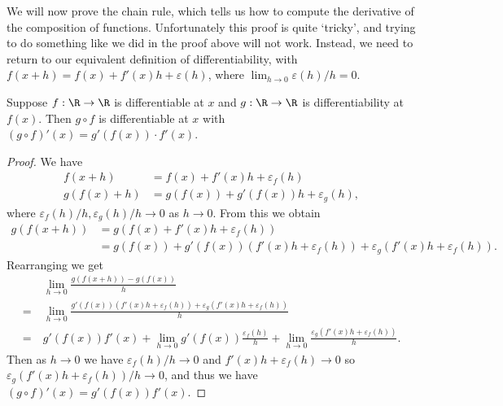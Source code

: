 We will now prove the chain rule, which tells us how to compute the derivative of the composition of functions. Unfortunately this proof is quite `tricky', and trying to do something like we did in the proof above will not work. Instead, we need to return to our equivalent definition of differentiability, with $f(x + h) = f(x) + f'(x) h + \varepsilon(h)$, where $\displaystyle\lim_{h \to 0}\varepsilon(h)/h = 0$.

\begin{proposition}
	Suppose $f: \R \rightarrow \R$ is differentiable at $x$ and $g: \R \rightarrow \R$ is differentiability at $f(x)$. Then $g \circ f$ is differentiable at $x$ with $(g \circ f)'(x) = g'(f(x)) \cdot f'(x)$.
\end{proposition}
\begin{proof}
	We have
	\begin{align*}
	f(x + h) &= f(x) + f'(x)h + \varepsilon_f(h) \\
		g(f(x) + h) &= g(f(x)) + g'(f(x)) h + \varepsilon_g(h),
	\end{align*}
	where $\varepsilon_f(h)/h, \varepsilon_g(h)/h \rightarrow 0$ as $h \rightarrow 0$. From this we obtain
	\begin{align*}
		g(f(x + h)) &= g(f(x) + f'(x)h + \varepsilon_f(h)) \\
		&= g(f(x)) + g'(f(x))(f'(x)h + \varepsilon_f(h)) + \varepsilon_g(f'(x)h + \varepsilon_f(h)).
	\end{align*}
	Rearranging we get
	\begin{align*}
		&\lim_{h \to 0}\frac{g(f(x + h)) - g(f(x))}{h}\\
		=\ &\lim_{h \to 0} \frac{g'(f(x))(f'(x)h + \varepsilon_f(h)) + \varepsilon_g(f'(x)h + \varepsilon_f(h))}{h} \\
		=\ &g'(f(x))f'(x) +  \lim_{h \to 0}g'(f(x)) \frac{\varepsilon_f(h)}{h} +\lim_{h \to 0}\frac{\varepsilon_g(f'(x)h + \varepsilon_f(h))}{h}.
	\end{align*}
	Then as $h \rightarrow 0$ we have $\varepsilon_f (h)/h \rightarrow 0$ and $f'(x)h + \varepsilon_f(h) \rightarrow 0$ so $\varepsilon_g(f'(x)h + \varepsilon_f(h))/h \rightarrow 0$, and thus we have
	$
	(g \circ f)'(x) = g'(f(x))f'(x).
	$
\end{proof}



